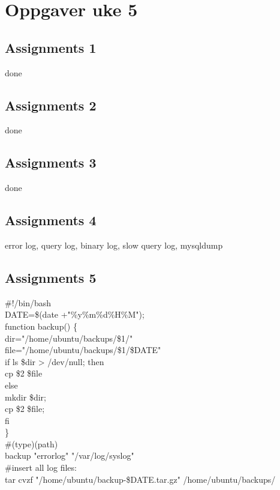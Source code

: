 \section{Oppgaver uke 5}

\subsection{Assignments 1} 
done
\subsection{Assignments 2}
done
\subsection{Assignments 3}
done
\subsection{Assignments 4} 
error log, query log, binary log, slow query log, mysqldump

\subsection{Assignments 5} 
\#!/bin/bash\\

DATE=\$(date +"\%y\%m\%d\%H\%M");\\

function backup() \{\\
dir="/home/ubuntu/backups/\$1/"\\
file="/home/ubuntu/backups/\$1/\$DATE"\\
        if ls \$dir > /dev/null; then\\
                cp \$2 \$file\\
        else\\
                mkdir \$dir;\\
                cp \$2 \$file;\\
        fi\\
\}\\

\#(type)(path)\\
backup "errorlog" "/var/log/syslog"\\
\#insert all log files:\\

tar cvzf "/home/ubuntu/backup-\$DATE.tar.gz" /home/ubuntu/backups/\\

